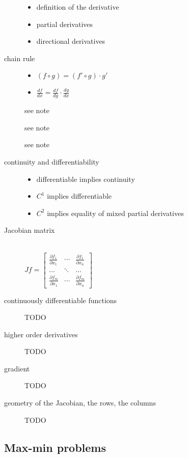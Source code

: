 \begin{description}
\item[]\hfill
	\begin{itemize}
		\item definition of the derivative
		\item partial derivatives
		\item directional derivatives
	\end{itemize}
\item[chain rule]\hfill
	\begin{itemize}
	\item$(f\circ g) = (f' \circ g)\cdot g'$
	\item$\frac{d f}{d x} = \frac{d f}{d g}\cdot \frac{d g}{d x}$
	\end{itemize}
\item[] see note
\item[] see note
\item[] see note
\item[continuity and differentiability]\hfill
	\begin{itemize}
	\item differentiable implies continuity
	\item $C^1$ implies differentiable
	\item $C^2$ implies equality of mixed partial derivatives
	\end{itemize}
\item[Jacobian matrix]\hfill\\
	$
	Jf = \begin{bmatrix}
	  \frac{\partial f_1}{\partial x_1} & \cdots & \frac{\partial f_1}{\partial x_n}\\
	  \ldots & \ddots & \ldots \\
	  \frac{\partial f_m}{\partial x_1} & \cdots & \frac{\partial f_m}{\partial x_n}
	 \end{bmatrix}
	$
\item[continuously differentiable functions]TODO
\item[higher order derivatives]TODO
\item[gradient]TODO
\item[geometry of the Jacobian, the rows, the columns]TODO
\end{description}


\subsection{Max-min problems}

